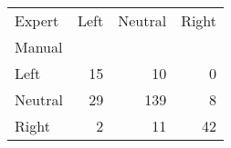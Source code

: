 \begin{tabular}{lrrr}
\toprule
Expert &  Left &  Neutral &  Right \\
Manual  &       &          &        \\
\midrule
Left    &    15 &       10 &      0 \\
Neutral &    29 &      139 &      8 \\
Right   &     2 &       11 &     42 \\
\bottomrule
\end{tabular}
